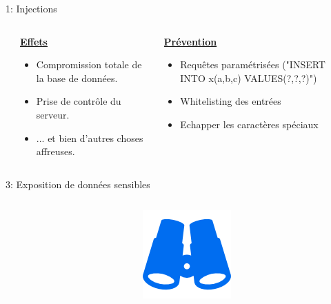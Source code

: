 \documentclass[final,hyperref={pdfpagelabels=false}]{beamer}
\begin{document}
\begin{frame}[t]
\begin{columns}[t]
\begin{column}{.465\textwidth}
\begin{block}{1: Injections}
	\begin{columns}[T]
    \begin{column}{.01\textwidth}
    \end{column}
	\begin{column}{.45\textwidth} %
	\vfill
	\uline{\textbf{Effets}}
	\begin{itemize}
		\item Compromission totale de la base de données.
		\item Prise de contrôle du serveur.
		\item ... et bien d'autres choses affreuses.
	\end{itemize}
		\end{column}

	\begin{column}{.45\textwidth} %
		\vfill
		\uline{\textbf{Prévention}}
		\begin{itemize}
			\item Requêtes paramétrisées ("INSERT INTO x(a,b,c) VALUES(?,?,?)")
			\item Whitelisting des entrées 
			\item Echapper les caractères spéciaux
		\end{itemize}
	\end{column}
	\end{columns}

\end{block}


\begin{block}{3: Exposition de données sensibles}
	\begin{columns}[T]

		\begin{column}{.01\textwidth}
		\end{column}
		\begin{column}{.115\textwidth} %
			\includegraphics[scale=1.35]{binoculars.png}
		\end{column}


\end{columns}
\end{block}
\end{column}
\end{columns}
\end{frame}
\end{document}
